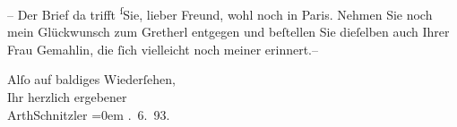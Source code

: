 \pstart
           {\pb}– Der Brief da trifft \substVorne{}\textsuperscript{ſ}\substDazwischen{}S\substHinten{}ie, lieber Freund, wohl noch in Paris.
               Nehmen Sie noch mein Glückwunsch zum Gretherl
               entgegen und beſtellen Sie dieſelben auch Ihrer Frau Gemahlin, die{ }ſich vielleicht noch meiner erinnert.–\pend
           
\pstart
           Alſo auf baldiges Wiederſehen,{\\[\baselineskip]}Ihr herzlich ergebener{\\[\baselineskip]}\spacefill\mbox{ArthSchnitzler}\pend
           \leftskip=0em{}
. 6. 93.\pend
           \endnumbering{}  \newcommand{\dateiname}{L03902}\newcommand{\titel}{Arthur Schnitzler an Theodor Herzl, 21. 6. 1893}\newcommand{\editorInnen}{Herausgegeben von Jahnke, SelmaMüller, Martin Anton}
